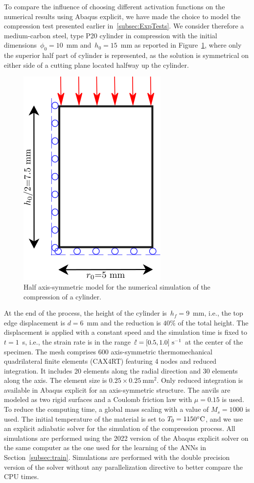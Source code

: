 \documentclass[algorithms,article,submit,pdftex,oneauthors]{Definitions/mdpi}
\makeatletter
\DeclareRobustCommand{\mdot}[1]{\accentset{\mbox{\bfseries .}}{#1}}
\DeclareRobustCommand{\ie}{i.e.,\@\xspace}
\DeclareRobustCommand{\ps}{\text{s}^{-1}}
\DeclareRobustCommand{\GPa}{\text{GPa}}
\makeatother
\begin{document}
To compare the influence of choosing different activation functions on the numerical results using Abaqus explicit, we have made the choice to model the compression test presented earlier in~\ref{subsec:ExpTests}.
We consider therefore a medium-carbon steel, type P20 cylinder in compression with the initial dimensions~$\phi_{0}=10$~mm and~$h_{0}=15$~mm as reported in Figure~\ref{fig:Num-model}, where only the superior half part of cylinder is represented, as the solution is symmetrical on either side of a cutting plane located halfway up the cylinder.
\begin{figure}[h!]
\centering
\includegraphics[width=0.25\columnwidth]{Figures/CyCompression}
\caption{Half axis-symmetric model for the numerical simulation of the compression of a cylinder.}
\label{fig:Num-model}
\end{figure}
At the end of the process, the height of the cylinder is~$h_f=9$~mm, \ie the top edge displacement is $d=6$~mm and the reduction is $40\%$ of the total height.
The displacement is applied with a constant speed and the simulation time is fixed to $t=1$~s, \ie the strain rate is in the range $\mdot{\varepsilon}=[0.5,1.0]~\ps$ at the center of the specimen.
The mesh comprises 600 axis-symmetric thermomechanical quadrilateral finite elements (CAX4RT) featuring 4 nodes and reduced integration.
It includes 20 elements along the radial direction and 30 elements along the axis.
The element size is $0.25\times0.25~\text{mm}^2$.
Only reduced integration is available in Abaqus explicit for an axis-symmetric structure.
The anvils are modeled as two rigid surfaces and a Coulomb friction law with $\mu=0.15$ is used.
To reduce the computing time, a global mass scaling with a value of $M_s=1000$ is used.
The initial temperature of the material is set to $T_{0}=1150\celsius$, and we use an explicit adiabatic solver for the simulation of the compression process.
All simulations are performed using the 2022 version of the Abaqus explicit solver on the same computer as the one used for the learning of the ANNs in Section~\ref{subsec:train}.
Simulations are performed with the double precision version of the solver without any parallelization directive to better compare the CPU times.
\end{document}
